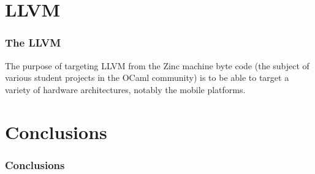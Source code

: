 \documentclass{beamer}
\begin{document}
  \section{LLVM}
  \begin{frame}
    \frametitle{The LLVM} The purpose of targeting LLVM from the Zinc
    machine byte code (the subject of various student projects in the
    OCaml community) is to be able to target a variety of hardware
    architectures, notably the mobile platforms.
  \end{frame}
  \section{Conclusions}
  \begin{frame}
    \frametitle{Conclusions}
  \end{frame}
\end{document}
